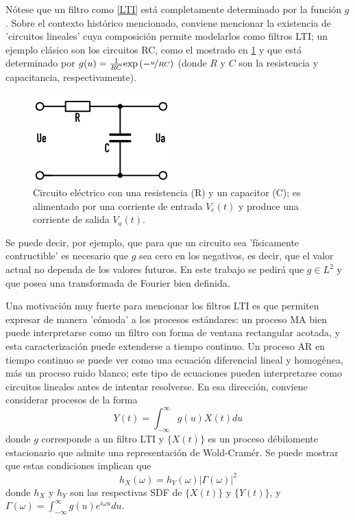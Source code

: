 \documentclass[12pt,a4paper]{mitthesis}
\newcommand{\intR}{\int_{-\infty}^{\infty}}
\newcommand{\abso}[1]{\left| #1 \right|}
\begin{document}
N\'otese que un filtro como \ref{LTI} est\'a completamente determinado por la funci\'on $g$. 
Sobre el contexto hist\'orico mencionado, conviene mencionar la existencia de 'circuitos lineales' 
cuya composici\'on permite modelarlos como filtros LTI; un ejemplo cl\'asico son los circuitos RC, 
como el mostrado en \ref{rrcc} y que est\'a determinado por
$g(u) = \frac{1}{R C} \text{exp}\left( -\nicefrac{u}{R C} \right)$ (donde $R$ y $C$ son la
resistencia y capacitancia, respectivamente).

\begin{figure}
\centering
\includegraphics[width=0.4\linewidth]{rc.png} 
\caption{Circuito el\'ectrico con una resistencia (R) y un capacitor (C); es alimentado por una 
corriente de entrada $V_e(t)$ y produce una corriente de salida $V_a(t)$. 
}
\label{rrcc}
\end{figure}

Se puede decir, por ejemplo, que para que un circuito sea 'f\'isicamente contructible' es necesario 
que $g$ sea cero en los negativos, es decir,  que el valor actual no dependa de los valores futuros. En este 
trabajo se pedir\'a que $g\in L^{2}$ y que posea una transformada de Fourier bien definida.

Una motivaci\'on muy fuerte para mencionar los filtros LTI es que permiten expresar de manera
'c\'omoda' a los procesos est\'andares: un proceso MA bien puede interpretarse como un filtro con 
forma de ventana rectangular acotada, y esta caracterizaci\'on puede extenderse a tiempo continuo.
Un proceso AR en tiempo continuo se puede ver como una ecuaci\'on diferencial lineal y homog\'enea,
m\'as un proceso ruido blanco; este tipo de ecuaciones pueden interpretarse como circuitos lineales
antes de intentar resolverse.
En esa direcci\'on, conviene considerar procesos de la forma
\begin{equation*}
Y(t) = \intR g(u) X(t) du
\end{equation*}
donde $g$ corresponde a un filtro LTI y $\{ X(t) \}$ es un proceso d\'ebilomente estacionario que
admite una representaci\'on de Wold-Cram\'er. Se puede mostrar que estas condiciones implican que
\begin{equation*}
h_X(\omega) = h_Y(\omega) \abso{\Gamma(\omega)}^{2}
\end{equation*}
donde $h_X$ y $h_Y$ son las respectivas SDF de $\{X(t)\}$ y $\{Y(t)\}$, y 
$\Gamma(\omega) = \intR g(u) e^{i \omega u} du$.
\end{document}
